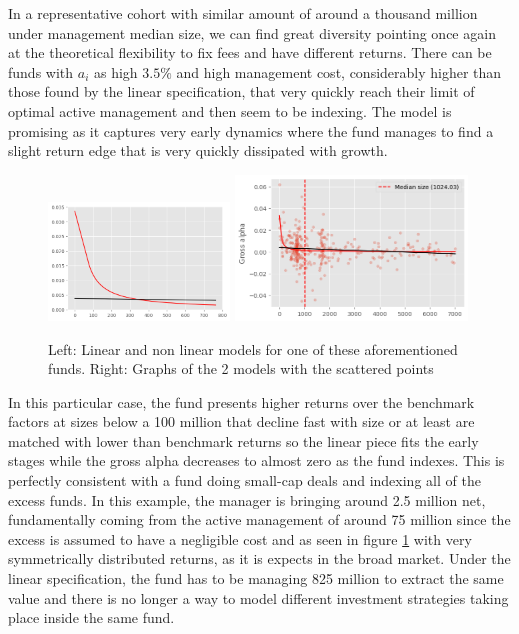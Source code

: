 \documentclass[12pt]{article}
\begin{document}
 In a representative cohort with similar amount of around a thousand million under management median size, we can find great diversity pointing once again at the theoretical flexibility to fix fees and have different returns. There can be funds with $a_i$ as high $3.5\% $ and high management cost, considerably higher than those found by the linear specification, that very quickly reach their limit of optimal active management and then seem to be indexing. The model is promising as it captures very early dynamics where the fund manages to find a slight return edge that is very quickly dissipated with growth. 


\begin{figure}[H]
    \centering
    \includegraphics[width=0.43\textwidth]{Fund101112.png}
    \includegraphics[width=0.55\textwidth]{Fund101112_scatter.png}
    \caption{Left: Linear and non linear models for one of these aforementioned funds. Right: Graphs of the 2 models with the scattered points}
    \label{fig:fund101112}
\end{figure}

In this particular case, the fund presents higher returns over the benchmark factors at sizes below a 100 million that decline fast with size or at least are matched with lower than benchmark returns so the linear piece fits the early stages while the gross alpha decreases to almost zero as the fund indexes. This is perfectly consistent with a fund doing small-cap deals and indexing all of the excess funds. In this example, the manager is bringing around 2.5 million net, fundamentally coming from the active management of around 75 million since the excess is assumed to have a negligible cost and as seen in figure \ref{fig:fund101112} with very symmetrically distributed returns, as it is expects in the broad market. Under the linear specification, the fund has to be managing 825 million to extract the same value and there is no longer a way to model different investment strategies taking place inside the same fund.
\end{document}
